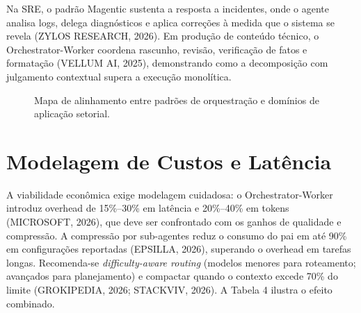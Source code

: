 \documentclass[12pt,a4paper]{article}
\begin{document}
Na SRE, o padrão Magentic sustenta a resposta a incidentes, onde o agente analisa logs, delega diagnósticos e aplica correções à medida que o sistema se revela (ZYLOS RESEARCH, 2026). Em produção de conteúdo técnico, o Orchestrator-Worker coordena rascunho, revisão, verificação de fatos e formatação (VELLUM AI, 2025), demonstrando como a decomposição com julgamento contextual supera a execução monolítica.

\begin{figure}[htbp]
\centering
{}
\caption{Mapa de alinhamento entre padrões de orquestração e domínios de aplicação setorial.}
\end{figure}


\section{Modelagem de Custos e Latência}

A viabilidade econômica exige modelagem cuidadosa: o Orchestrator-Worker introduz overhead de 15\%–30\% em latência e 20\%–40\% em tokens (MICROSOFT, 2026), que deve ser confrontado com os ganhos de qualidade e compressão. A compressão por sub-agentes reduz o consumo do pai em até 90\% em configurações reportadas (EPSILLA, 2026), superando o overhead em tarefas longas. Recomenda-se \textit{difficulty-aware routing} (modelos menores para roteamento; avançados para planejamento) e compactar quando o contexto excede 70\% do limite (GROKIPEDIA, 2026; STACKVIV, 2026). A Tabela 4 ilustra o efeito combinado.
\end{document}
